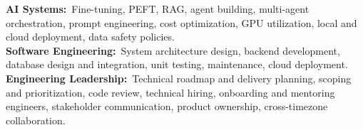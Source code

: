 
\begin{cvparagraph}
{\bodyfont\bfseries AI Systems:}~Fine-tuning, PEFT, RAG, agent building, multi-agent orchestration, prompt engineering, cost optimization, GPU utilization, local and cloud deployment, data safety policies.
\\[2mm]
{\bodyfont\bfseries Software Engineering:}~System architecture design, backend development, database design and integration, unit testing, maintenance, cloud deployment.
\\[2mm]
{\bodyfont\bfseries Engineering Leadership:}~Technical roadmap and delivery planning, scoping and prioritization, code review, technical hiring, onboarding and mentoring engineers, stakeholder communication, product ownership, cross-timezone collaboration.

\end{cvparagraph}
